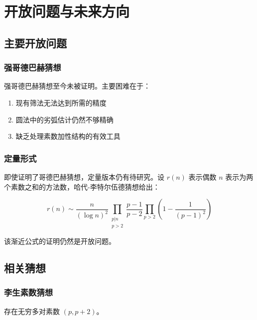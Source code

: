 \section{开放问题与未来方向}\label{sec:open_problems}

\subsection{主要开放问题}

\subsubsection{强哥德巴赫猜想}

强哥德巴赫猜想至今未被证明。主要困难在于：

\begin{enumerate}
    \item 现有筛法无法达到所需的精度
    \item 圆法中的劣弧估计仍然不够精确
    \item 缺乏处理素数加性结构的有效工具
\end{enumerate}

\subsubsection{定量形式}

即使证明了哥德巴赫猜想，定量版本仍有待研究。设 $r(n)$ 表示偶数 $n$ 表示为两个素数之和的方法数，哈代-李特尔伍德猜想给出：

\begin{equation}
    r(n) \sim \frac{n}{(\log n)^2} \prod_{\substack{p|n \\ p>2}} \frac{p-1}{p-2} \prod_{p>2} \left(1 - \frac{1}{(p-1)^2}\right)
\end{equation}

该渐近公式的证明仍然是开放问题。

\subsection{相关猜想}

\subsubsection{李生素数猜想}

\begin{conjecture}[李生素数猜想]
    存在无穷多对素数 $(p, p+2)$。
\end{conjecture}

